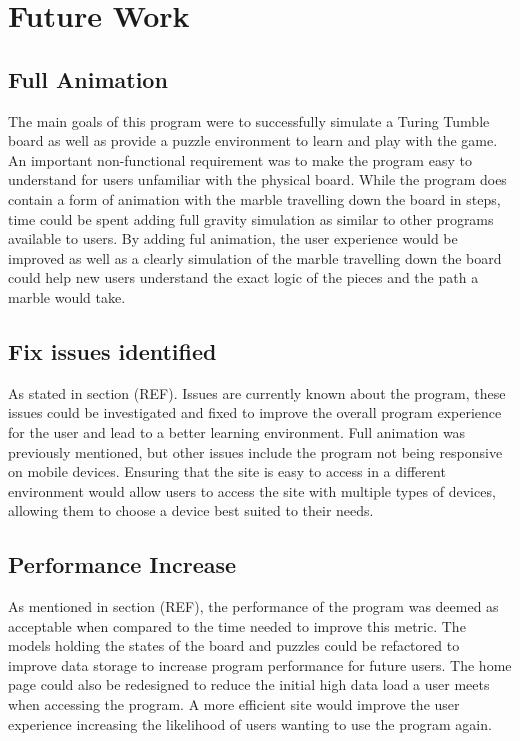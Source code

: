 \documentclass{l4proj}
\begin{document}
\section{Future Work}
\subsection{Full Animation}
The main goals of this program were to successfully simulate a Turing Tumble board as well as provide a puzzle environment to learn and play with the game. An important non-functional requirement was to make the program easy to understand for users unfamiliar with the physical board. While the program does contain a form of animation with the marble travelling down the board in steps, time could be spent adding full gravity simulation as similar to other programs available to users. By adding ful animation, the user experience would be improved as well as a clearly simulation of the marble travelling down the board could help new users understand the exact logic of the pieces and the path a marble would take.

\subsection{Fix issues identified}
As stated in section (REF). Issues are currently known about the program, these issues could be investigated and fixed to improve the overall program experience for the user and lead to a better learning environment. Full animation was previously mentioned, but other issues include the program not being responsive on mobile devices. Ensuring that the site is easy to access in a different environment would allow users to access the site with multiple types of devices, allowing them to choose a device best suited to their needs.

\subsection{Performance Increase}
As mentioned in section (REF), the performance of the program was deemed as acceptable when compared to the time needed to improve this metric. The models holding the states of the board and puzzles could be refactored to improve data storage to increase program performance for future users. The home page could also be redesigned to reduce the initial high data load a user meets when accessing the program. A more efficient site would improve the user experience increasing the likelihood of users wanting to use the program again. 
\end{document}
